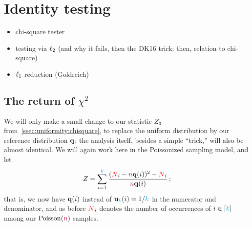 \section{Identity testing}
  \label{sec:identity}
\tbc
\begin{itemize}
\item chi-square tester
\item testing via $\lp[2]$ (and why it fails, then the DK16 trick; then, relation to chi-square)
\item $\lp[1]$ reduction (Goldreich)
\end{itemize}

\subsection{The return of $\chi^2$}
	\label{ssec:chisquare:identity}

We will only make a small change to our statistic $Z_3$ from~\cref{ssec:uniformity:chisquare}, to replace the uniform distribution by our reference distribution $\q$; the analysis itself, besides a simple ``trick,'' will also be almost identical. We will again work here in the Poissonized sampling model, and let
\begin{equation}
  \label{eq:def:z:chisquare:identity}
    Z = \sum_{i=1}^\ab \frac{(\occur_i-\ns\q(i))^2- \occur_i}{\ns\q(i)}\,;
\end{equation}
that is, we now have $\q(i)$ instead of $\uniform_\ab(i)=1/\ab$ in the numerator and denominator, and as before $\occur_i$ denotes the number of occurrences of $i\in[\ab]$ among our $\poisson{\ns}$ samples. 

